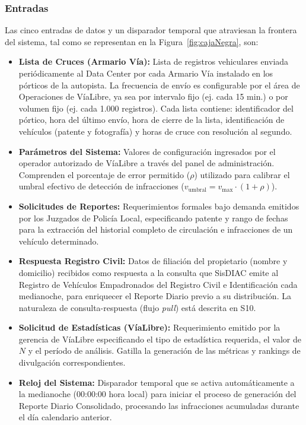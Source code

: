 \documentclass[12pt,letterpaper]{article}
\begin{document}
\subsubsection{Entradas}
Las cinco entradas de datos y un disparador temporal que atraviesan la frontera del sistema, tal como se representan en la Figura~\ref{fig:cajaNegra}, son:
\begin{itemize}
	\item \textbf{Lista de Cruces (Armario Vía):} Lista de registros vehiculares enviada periódicamente al Data Center por cada Armario Vía instalado en los pórticos de la autopista. La frecuencia de envío es configurable por el área de Operaciones de VíaLibre, ya sea por intervalo fijo (ej. cada 15 min.) o por volumen fijo (ej. cada 1.000 registros). Cada lista contiene: identificador del pórtico, hora del último envío, hora de cierre de la lista, identificación de vehículos (patente y fotografía) y horas de cruce con resolución al segundo.
	\item \textbf{Parámetros del Sistema:} Valores de configuración ingresados por el operador autorizado de VíaLibre a través del panel de administración. Comprenden el porcentaje de error permitido ($\rho$) utilizado para calibrar el umbral efectivo de detección de infracciones ($v_{\text{umbral}} = v_{\text{max}} \cdot (1 + \rho)$).
	\item \textbf{Solicitudes de Reportes:} Requerimientos formales bajo demanda emitidos por los Juzgados de Policía Local, especificando patente y rango de fechas para la extracción del historial completo de circulación e infracciones de un vehículo determinado.
	\item \textbf{Respuesta Registro Civil:} Datos de filiación del propietario (nombre y domicilio) recibidos como respuesta a la consulta que SisDIAC emite al Registro de Vehículos Empadronados del Registro Civil e Identificación cada medianoche, para enriquecer el Reporte Diario previo a su distribución. La naturaleza de consulta-respuesta (flujo \textit{pull}) está descrita en S10.
	\item \textbf{Solicitud de Estadísticas (VíaLibre):} Requerimiento emitido por la gerencia de VíaLibre especificando el tipo de estadística requerida, el valor de $N$ y el período de análisis. Gatilla la generación de las métricas y rankings de divulgación correspondientes.
	\item \textbf{Reloj del Sistema:} Disparador temporal que se activa automáticamente a la medianoche (00:00:00 hora local) para iniciar el proceso de generación del Reporte Diario Consolidado, procesando las infracciones acumuladas durante el día calendario anterior.
\end{itemize}
\end{document}
